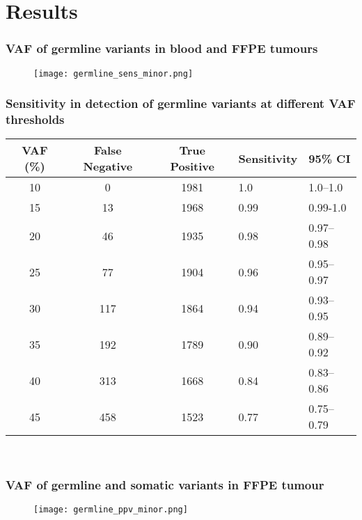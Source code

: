 \documentclass{beamer}
\begin{document}
\section{Results}

\begin{frame}
\frametitle{VAF of germline variants in blood and FFPE tumours}
\begin{figure}[t]
    \texttt{[image: germline\_sens\_minor.png]}
\end{figure}
\end{frame}

\begin{frame}
\frametitle{Sensitivity in detection of germline variants at different VAF thresholds}
\begin{table}
\footnotesize
\centering
      \begin{tabular}{ccc|ll}
        \hline
        VAF (\%) & False Negative & True Positive & Sensitivity & 95\% CI
        \\
        \hline
        10 & 0 & 1981 & 1.0 & 1.0--1.0
        \\
        15 & 13 & 1968 & 0.99 & 0.99-1.0
        \\
        20 & 46 & 1935 & 0.98 & 0.97--0.98
        \\
        25 & 77 & 1904 & 0.96 & 0.95--0.97
        \\
        30 & 117 & 1864 & 0.94 & 0.93--0.95
        \\
        35 & 192 & 1789 & 0.90 & 0.89--0.92
        \\
        40 & 313 & 1668 & 0.84 & 0.83--0.86
        \\
        45 & 458 & 1523 & 0.77 & 0.75--0.79
        \\
				\hline
      \end{tabular} \\
\end{table}
\end{frame}

\begin{frame}
\frametitle{VAF of germline and somatic variants in FFPE tumour}
\begin{figure}[t]
    \texttt{[image: germline\_ppv\_minor.png]}
\end{figure}
\end{frame}
\end{document}
